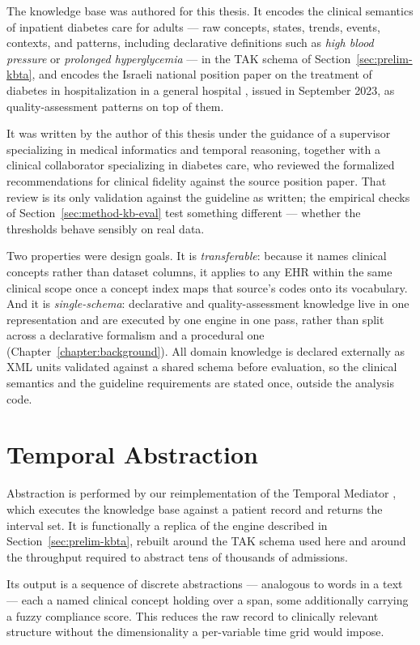 The knowledge base was authored for this thesis. It encodes the clinical semantics of inpatient diabetes care for adults --- raw concepts, states, trends, events, contexts, and patterns, including declarative definitions such as \emph{high blood pressure} or \emph{prolonged hyperglycemia} --- in the TAK schema of Section~\ref{sec:prelim-kbta}, and encodes the Israeli national position paper on the treatment of diabetes in hospitalization in a general hospital \citep{hochberg2023inpatient}, issued in September 2023, as quality-assessment patterns on top of them.

It was written by the author of this thesis under the guidance of a supervisor specializing in medical informatics and temporal reasoning, together with a clinical collaborator specializing in diabetes care, who reviewed the formalized recommendations for clinical fidelity against the source position paper. That review is its only validation against the guideline as written; the empirical checks of Section~\ref{sec:method-kb-eval} test something different --- whether the thresholds behave sensibly on real data.

Two properties were design goals. It is \emph{transferable}: because it names clinical concepts rather than dataset columns, it applies to any EHR within the same clinical scope once a concept index maps that source's codes onto its vocabulary. And it is \emph{single-schema}: declarative and quality-assessment knowledge live in one representation and are executed by one engine in one pass, rather than split across a declarative formalism and a procedural one (Chapter~\ref{chapter:background}). All domain knowledge is declared externally as XML units validated against a shared schema before evaluation, so the clinical semantics and the guideline requirements are stated once, outside the analysis code.

\section{Temporal Abstraction}

Abstraction is performed by our reimplementation of the Temporal Mediator \citep{mediator-github}, which executes the knowledge base against a patient record and returns the interval set. It is functionally a replica of the engine described in Section~\ref{sec:prelim-kbta}, rebuilt around the TAK schema used here and around the throughput required to abstract tens of thousands of admissions.

Its output is a sequence of discrete abstractions --- analogous to words in a text --- each a named clinical concept holding over a span, some additionally carrying a fuzzy compliance score. This reduces the raw record to clinically relevant structure without the dimensionality a per-variable time grid would impose.

